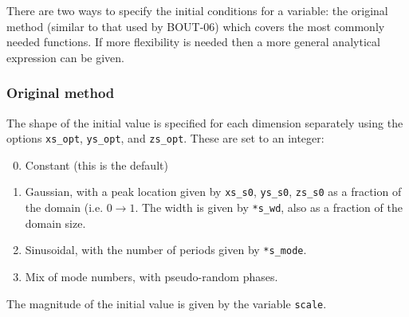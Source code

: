 \documentclass[12pt]{article}
\newcommand{\code}[1]{\texttt{#1}}
\def\Rarrow{\rightarrow}
\begin{document}
There are two ways to specify the initial conditions for a variable: the
original method (similar to that used by BOUT-06) which covers the most
commonly needed functions. If more flexibility is needed then a more general
analytical expression can be given.


\subsubsection{Original method}
%
The shape of the initial value is specified for each dimension separately using
the options \code{xs\_opt}, \code{ys\_opt}, and \code{zs\_opt}. These are set
to an integer:
%
\begin{enumerate}
\setcounter{enumi}{-1}
\item Constant (this is the default)
\item Gaussian, with a peak location given by \code{xs\_s0}, \code{ys\_s0},
    \code{zs\_s0} as a fraction of the domain (i.e. $0 \Rarrow 1$.  The width
    is given by \code{*s\_wd}, also as a fraction of the domain size.
\item Sinusoidal, with the number of periods given by \code{*s\_mode}.
\item Mix of mode numbers, with pseudo-random phases.
\end{enumerate}
%
The magnitude of the initial value is given by the variable \code{scale}.
\end{document}
